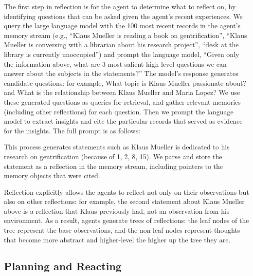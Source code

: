 The first step in reflection is for the agent to determine what to reflect on, by identifying questions that can be asked given the agent's recent experiences. We query the large language model with the 100 most recent records in the agent's memory stream (e.g., ``Klaus Mueller is reading a book on gentrification'', ``Klaus Mueller is conversing with a librarian about his research project'', ``desk at the library is currently unoccupied'') and prompt the language model, ``Given only the information above, what are 3 most salient high-level questions we can answer about the subjects in the statements?'' The model's response generates candidate questions: for example, {\color{darkgray}\small\fontfamily{}\selectfont
What topic is Klaus Mueller passionate about?} and {\color{darkgray}\small\fontfamily{}\selectfont
What is the relationship between Klaus Mueller and Maria Lopez?} We use these generated questions as queries for retrieval, and gather relevant memories (including other reflections) for each question. Then we prompt the language model to extract insights and cite the particular records that served as evidence for the insights. The full prompt is as follows:

\begin{quote}

\end{quote}

This process generates statements such as {\color{darkgray}\small\fontfamily{}\selectfont
Klaus Mueller is dedicated to his research on gentrification (because of 1, 2, 8, 15)}. We parse and store the statement as a reflection in the memory stream, including pointers to the memory objects that were cited. 

Reflection explicitly allows the agents to reflect not only on their observations but also on other reflections: for example, the second statement about Klaus Mueller above is a reflection that Klaus previously had, not an observation from his environment. As a result, agents generate trees of reflections: the leaf nodes of the tree represent the base observations, and the non-leaf nodes represent thoughts that become more abstract and higher-level the higher up the tree they are.

\subsection{Planning and Reacting}

